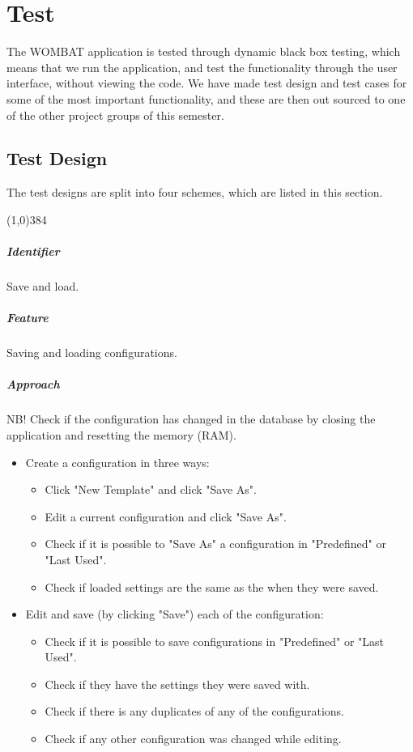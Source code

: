 \chapter{Test}
\label{cha:test}
The WOMBAT application is tested through dynamic black box testing, which means that we run the application, and test the functionality through the user interface, without viewing the code. We have made test design and test cases for some of the most important functionality, and these are then out sourced to one of the other project groups of this semester.

\section{Test Design}
\label{sec:test_design}
The test designs are split into four schemes, which are listed in this section.

\begin{center}
	\line(1,0){384}
\end{center}
\paragraph{Identifier}
	Save and load.
\paragraph{Feature}
	Saving and loading configurations.
\paragraph{Approach}
	NB! Check if the configuration has changed in the database by closing the application and resetting the memory (RAM).
		\begin{itemize} 
			\item Create a configuration in three ways:
				\begin{itemize}
					\item Click "New Template" and click "Save As".
					\item Edit a current configuration and click "Save As".
					\item Check if it is possible to "Save As" a configuration in "Predefined" or "Last Used".
					\item Check if loaded settings are the same as the when they were saved. 
				\end{itemize}
			\item Edit and save (by clicking "Save") each of the configuration:
		\begin{itemize}
			\item Check if it is possible to save configurations in "Predefined" or "Last Used".
			\item Check if they have the settings they were saved with.
			\item Check if there is any duplicates of any of the configurations.
			\item Check if any other configuration was changed while editing.	
		\end{itemize}
	\end{itemize}
